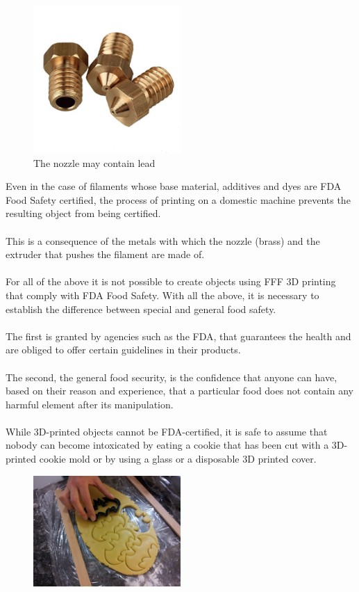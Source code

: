 \documentclass[11pt,a4paper]{article}
\begin{document}
\begin{figure}[H]
\centering
\includegraphics[width=0.5\textwidth,cfbox=azul_marcos 1pt 0pt]{FOTOS/NOZZLES}
\caption*{The nozzle may contain lead}
\end{figure}
Even in the case of filaments whose base material, additives and dyes are FDA Food Safety certified, the process of printing on a domestic machine prevents the resulting object from being certified.
\\\\
This is a consequence of the metals with which the nozzle (brass) and the extruder that pushes the filament are made of.
\\\\
For all of the above it is not possible to create objects using FFF 3D printing that comply with FDA Food Safety. With all the above, it is necessary to establish the difference between special and general food safety.
\\\\
The first is granted by agencies such as the FDA, that guarantees the health and are obliged to offer certain guidelines in their products.
\\\\
The second, the general food security, is the confidence that anyone can have, based on their reason and experience, that a particular food does not contain any harmful element after its manipulation.
\\\\
While 3D-printed objects cannot be FDA-certified, it is safe to assume that nobody can become intoxicated by eating a cookie that has been cut with a 3D-printed cookie mold or by using a glass or a disposable 3D printed cover.
\begin{figure}[H]
\centering
\includegraphics[width=0.5\textwidth,cfbox=azul_marcos 1pt 0pt]{FOTOS/CORTADORGALLETAS}
\end{figure}
\end{document}
